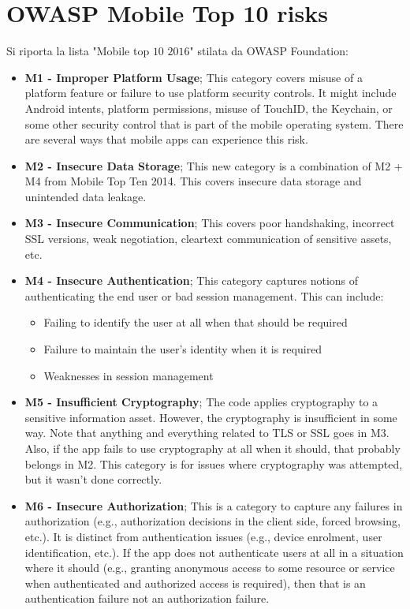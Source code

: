\chapter{OWASP Mobile Top 10 risks}

	Si riporta la lista "Mobile top $10$ $2016$"\cite{OWASPtop10} stilata da OWASP Foundation:
	
	\begin{itemize}
		\item \textbf{M1 - Improper Platform Usage}; This category covers misuse of a platform feature or failure to use platform security controls. It might include Android intents, platform permissions, misuse of TouchID, the Keychain, or some other security control that is part of the mobile operating system. There are several ways that mobile apps can experience this risk.
		\item \textbf{M2 - Insecure Data Storage}; This new category is a combination of M2 + M4 from Mobile Top Ten 2014. This covers insecure data storage and unintended data leakage.
		\item \textbf{M3 - Insecure Communication}; This covers poor handshaking, incorrect SSL versions, weak negotiation, cleartext communication of sensitive assets, etc.
		\item \textbf{M4 - Insecure Authentication}; This category captures notions of authenticating the end user or bad session management. This can include:
		\begin{itemize}
			\item Failing to identify the user at all when that should be required
			\item Failure to maintain the user's identity when it is required
			\item Weaknesses in session management
		\end{itemize}		
		\item \textbf{M5 - Insufficient Cryptography}; The code applies cryptography to a sensitive information asset. However, the cryptography is insufficient in some way. Note that anything and everything related to TLS or SSL goes in M3. Also, if the app fails to use cryptography at all when it should, that probably belongs in M2. This category is for issues where cryptography was attempted, but it wasn't done correctly.
		\item \textbf{M6 - Insecure Authorization}; This is a category to capture any failures in authorization (e.g., authorization decisions in the client side, forced browsing, etc.). It is distinct from authentication issues (e.g., device enrolment, user identification, etc.). If the app does not authenticate users at all in a situation where it should (e.g., granting anonymous access to some resource or service when authenticated and authorized access is required), then that is an authentication failure not an authorization failure.

\end{itemize}
